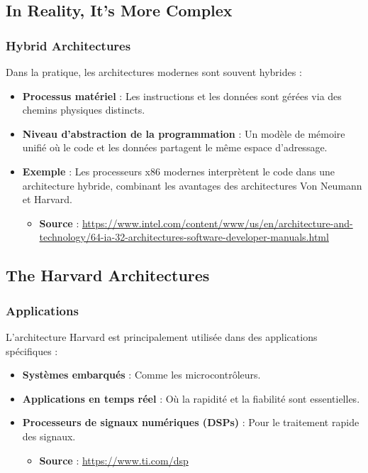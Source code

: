 \documentclass[10pt,a4paper]{article}
\begin{document}
\subsection*{In Reality, It's More Complex}

\subsubsection*{Hybrid Architectures}
Dans la pratique, les architectures modernes sont souvent hybrides :
\begin{itemize}
    \item \textbf{Processus matériel} : Les instructions et les données sont gérées via des chemins physiques distincts.
    \item \textbf{Niveau d'abstraction de la programmation} : Un modèle de mémoire unifié où le code et les données partagent le même espace d'adressage.
    \item \textbf{Exemple} : Les processeurs x86 modernes interprètent le code dans une architecture hybride, combinant les avantages des architectures Von Neumann et Harvard.
    \begin{itemize}
        \item \textbf{Source} : \url{https://www.intel.com/content/www/us/en/architecture-and-technology/64-ia-32-architectures-software-developer-manuals.html}
    \end{itemize}
\end{itemize}

\subsection*{The Harvard Architectures}

\subsubsection*{Applications}
L'architecture Harvard est principalement utilisée dans des applications spécifiques :
\begin{itemize}
    \item \textbf{Systèmes embarqués} : Comme les microcontrôleurs.
    \item \textbf{Applications en temps réel} : Où la rapidité et la fiabilité sont essentielles.
    \item \textbf{Processeurs de signaux numériques (DSPs)} : Pour le traitement rapide des signaux.
    \begin{itemize}
        \item \textbf{Source} : \url{https://www.ti.com/dsp}
    \end{itemize}
\end{itemize}
\end{document}
